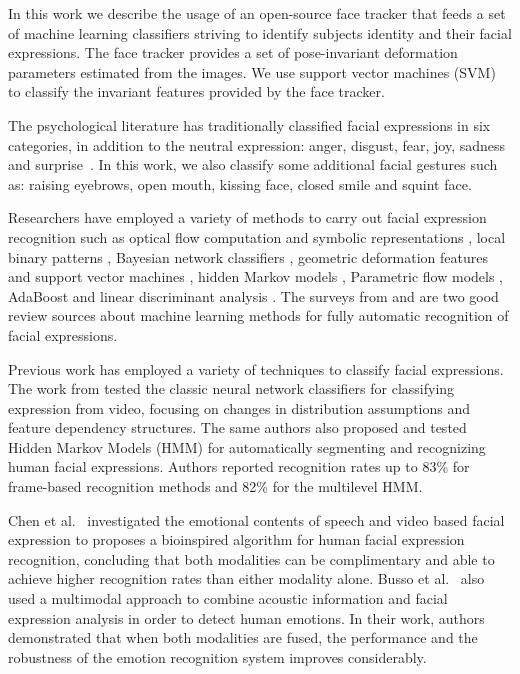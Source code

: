 \documentclass[]{article}
\begin{document}
In this work we describe the usage of an open-source face tracker that feeds a set of machine learning classifiers
striving to identify subjects identity and their facial expressions. The face tracker provides a set of pose-invariant
deformation parameters estimated from the images. We use support vector machines (SVM) to classify the invariant
features provided by the face tracker.


The psychological literature has traditionally classified facial expressions in six categories, in addition to the
neutral expression: anger, disgust, fear, joy, sadness and surprise~\cite{schmidt2002human}. In this work, we also
classify some additional facial gestures such as: raising eyebrows, open mouth, kissing face, closed smile and squint
face.


Researchers have employed a variety of methods to carry out facial expression recognition such as optical flow
computation  and symbolic representations \cite{Yacoob506414}, local binary patterns \cite{Shan2009803},  Bayesian
network classifiers \cite{Cohen1211408}, geometric deformation features and support vector machines
\cite{kotsia4032815}, hidden Markov models \cite{aleksic1597130, Cohen2003160}, Parametric flow models
\cite{blackAndYacoob}, AdaBoost and linear discriminant analysis \cite{bartlett1398364}. The surveys from
\cite{bartlett1398364} and \cite{Fasel2003259} are two good review sources about machine learning methods 
for fully automatic recognition of facial expressions. 


Previous work has employed a variety of techniques to classify  facial expressions. The work from \cite{Cohen2003160}
tested the classic neural network classifiers for classifying expression from video, focusing on changes in distribution
assumptions and feature dependency structures. The same authors also proposed and tested Hidden Markov Models (HMM) for
automatically segmenting and recognizing human facial expressions. Authors reported recognition rates up to 83\% for
frame-based recognition methods and 82\% for the multilevel HMM.


Chen et al.~\cite{Chen670976} investigated the emotional contents of speech and video based facial expression to
proposes a bioinspired algorithm for human facial expression recognition, concluding that both modalities can be
complimentary and able to achieve higher recognition rates than either modality alone. Busso et al.~\cite{Busso:2004} also
used a multimodal approach to combine acoustic information and facial expression analysis in order to detect human
emotions. In their work, authors demonstrated that when both modalities are fused, the performance and the robustness of
the emotion recognition system improves considerably.
\end{document}
